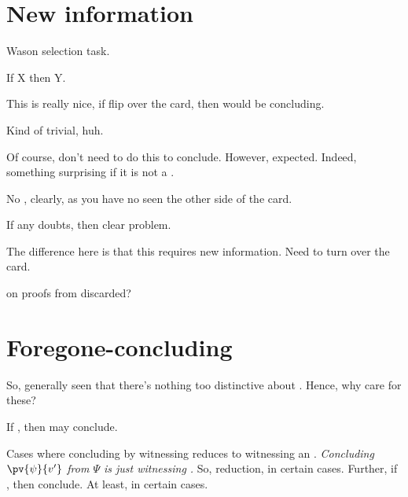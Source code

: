 \section{New information}

\begin{note}
  \begin{scenario}
    Wason selection task.

    If X then Y.
  \end{scenario}

  This is really nice, if flip over the card, then would be concluding.

  Kind of trivial, huh.

  Of course, don't need to do this to conclude.
  However, expected.
  Indeed, something surprising if it is not a \fc{}.

  No \wit{}, clearly, as you have no seen the other side of the card.

  If any doubts, then clear problem.

  The difference here is that this requires new information.
  Need to turn over the card.
\end{note}

\begin{note}
  \citeauthor{Easwaran:2009tm} on proofs from discarded?
\end{note}

\section{Foregone-concluding}

\begin{note}
  So, generally seen that there's nothing too distinctive about .
  Hence, why care for these?

  \begin{idea}
    \label{idea:reassignment}
    If \fc{}, then may conclude.
  \end{idea}

  Cases where concluding by witnessing reduces to witnessing an \fc{}.
  \emph{Concluding \(\pv{\psi}{v'}\) from \(\Psi\) is just witnessing \fc{}.}
  So, reduction, in certain cases.
  Further, if \fc{}, then conclude.
  At least, in certain cases.
\end{note}


